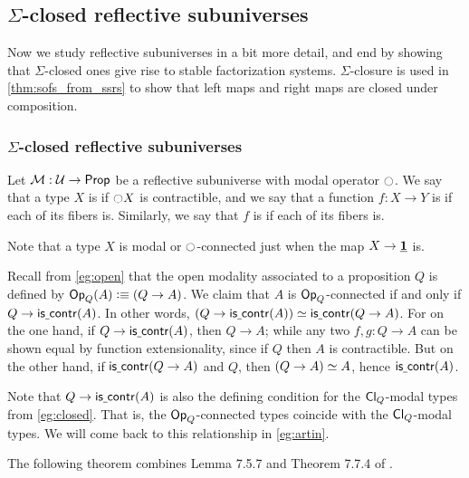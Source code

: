 \subsection{\texorpdfstring{$\Sigma$}{Σ}-closed reflective subuniverses}
\label{sec:ssrs}

Now we study reflective subuniverses in a bit more detail, and end by
showing that $\Sigma$-closed ones give rise to stable factorization
systems. $\Sigma$-closure is used in \autoref{thm:sofs_from_ssrs} to
show that left maps and right maps are closed under composition.



\subsubsection{\texorpdfstring{$\Sigma$}{Σ}-closed reflective subuniverses}
\label{sec:sigma-closed}

\begin{defn}\label{defn:connected}
Let $\mathcal{M}:\mathcal{U}\to\mathsf{Prop}$ be a reflective subuniverse with modal
operator ${\ocircle}$. We say
that a type $X$ is  if ${\ocircle} X$ is contractible,
and we say that a function $f:X\to Y$ is  if each
of its fibers is. Similarly, we say that $f$ is  if each of its
fibers is.
\end{defn}

Note that a type $X$ is modal or ${\ocircle}$-connected just when the map $X\to\underline{\mathbf{1}}$ is.

\begin{eg}\label{eg:closed-connected}
  Recall from \cref{eg:open} that the open modality associated to a proposition $Q$ is defined by $\mathsf{Op}_{Q}(A) \vcentcolon\equiv (Q\to A)$.
  We claim that $A$ is $\mathsf{Op}_{Q}$-connected if and only if $Q \to\mathsf{is\underline{\ }{}contr}(A)$.
  In other words, $(Q \to\mathsf{is\underline{\ }{}contr}(A))\simeq \mathsf{is\underline{\ }{}contr}(Q\to A)$.
  For on the one hand, if $Q\to \mathsf{is\underline{\ }{}contr}(A)$, then $Q\to A$; while any two $f,g:Q\to A$ can be shown equal by function extensionality, since if $Q$ then $A$ is contractible.
  But on the other hand, if $\mathsf{is\underline{\ }{}contr}(Q\to A)$ and $Q$, then $\eqv{(Q\to A)}{A}$, hence $\mathsf{is\underline{\ }{}contr}(A)$.

  Note that $Q \to\mathsf{is\underline{\ }{}contr}(A)$ is also the defining condition for the $\mathsf{Cl}_{Q}$-modal types from \cref{eg:closed}.
  That is, the $\mathsf{Op}_{Q}$-connected types coincide with the $\mathsf{Cl}_{Q}$-modal types.
  We will come back to this relationship in \cref{eg:artin}.
\end{eg}

The following theorem combines Lemma 7.5.7 and Theorem 7.7.4 of \cite{hottbook}.

